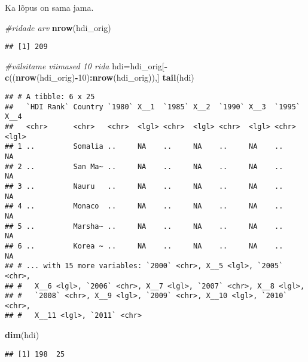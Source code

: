 \documentclass[]{article}
\newenvironment{Shaded}{\begin{snugshade}}{\end{snugshade}}
\newcommand{\KeywordTok}[1]{\textcolor[rgb]{0.13,0.29,0.53}{\textbf{#1}}}
\newcommand{\DecValTok}[1]{\textcolor[rgb]{0.00,0.00,0.81}{#1}}
\newcommand{\CommentTok}[1]{\textcolor[rgb]{0.56,0.35,0.01}{\textit{#1}}}
\newcommand{\OperatorTok}[1]{\textcolor[rgb]{0.81,0.36,0.00}{\textbf{#1}}}
\newcommand{\NormalTok}[1]{#1}
\begin{document}
Ka lõpus on sama jama.

\begin{Shaded}
\begin{Highlighting}[]
\CommentTok{#ridade arv}
\KeywordTok{nrow}\NormalTok{(hdi_orig)}
\end{Highlighting}
\end{Shaded}

\begin{verbatim}
## [1] 209
\end{verbatim}

\begin{Shaded}
\begin{Highlighting}[]
\CommentTok{#välsitame viimased 10 rida}
\NormalTok{hdi=hdi_orig[}\OperatorTok{-}\KeywordTok{c}\NormalTok{((}\KeywordTok{nrow}\NormalTok{(hdi_orig)}\OperatorTok{-}\DecValTok{10}\NormalTok{)}\OperatorTok{:}\KeywordTok{nrow}\NormalTok{(hdi_orig)),]}
\KeywordTok{tail}\NormalTok{(hdi)}
\end{Highlighting}
\end{Shaded}

\begin{verbatim}
## # A tibble: 6 x 25
##   `HDI Rank` Country `1980` X__1  `1985` X__2  `1990` X__3  `1995` X__4 
##   <chr>      <chr>   <chr>  <lgl> <chr>  <lgl> <chr>  <lgl> <chr>  <lgl>
## 1 ..         Somalia ..     NA    ..     NA    ..     NA    ..     NA   
## 2 ..         San Ma~ ..     NA    ..     NA    ..     NA    ..     NA   
## 3 ..         Nauru   ..     NA    ..     NA    ..     NA    ..     NA   
## 4 ..         Monaco  ..     NA    ..     NA    ..     NA    ..     NA   
## 5 ..         Marsha~ ..     NA    ..     NA    ..     NA    ..     NA   
## 6 ..         Korea ~ ..     NA    ..     NA    ..     NA    ..     NA   
## # ... with 15 more variables: `2000` <chr>, X__5 <lgl>, `2005` <chr>,
## #   X__6 <lgl>, `2006` <chr>, X__7 <lgl>, `2007` <chr>, X__8 <lgl>,
## #   `2008` <chr>, X__9 <lgl>, `2009` <chr>, X__10 <lgl>, `2010` <chr>,
## #   X__11 <lgl>, `2011` <chr>
\end{verbatim}

\begin{Shaded}
\begin{Highlighting}[]
\KeywordTok{dim}\NormalTok{(hdi)}
\end{Highlighting}
\end{Shaded}

\begin{verbatim}
## [1] 198  25
\end{verbatim}
\end{document}
